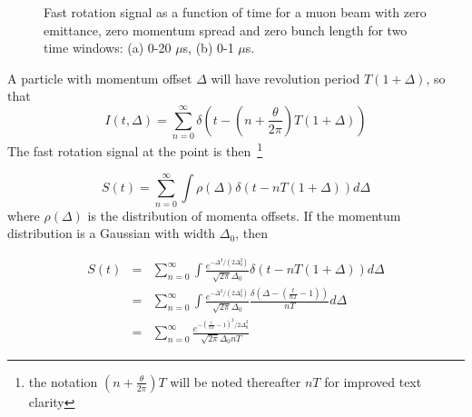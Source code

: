 \begin{figure}[bt]
\centering
{}
\caption{Fast rotation signal as a function of time for a muon beam with zero emittance, zero momentum spread and zero bunch length for two time windows: (a) 0-20 $\mu$s, (b) 0-1 $\mu$s.}
\label{fig:perfect_frs}
\end{figure}
 
A particle with momentum offset $\Delta$ will have revolution period $T(1+\Delta)$, so that 
\begin{equation}
I(t,\Delta)=\sum^{\infty}_{n=0}\delta\left(t-\left(n+\frac{\theta}{2\pi}\right)T\left(1+\Delta\right)\right) 
\end{equation}
The fast rotation signal at the point is then~\footnote{the notation $(n+\frac{\theta}{2\pi})T$ will be noted thereafter $nT$ for improved text clarity} 

\begin{equation}
S(t)=\sum^{\infty}_{n=0}\int\rho(\Delta)\delta\left(t-nT\left(1+\Delta\right)\right)d\Delta 
\end{equation}
where $\rho(\Delta)$ is the distribution of momenta offsets. If the momentum distribution is a Gaussian with width $\Delta_0$, then 

\begin{eqnarray}
S(t) &=& \sum^{\infty}_{n=0}\int\frac{e^{-\Delta^2/(2\Delta^2_0)}}{\sqrt{2\pi}\Delta_0}
\delta\left(t-nT\left(1+\Delta\right)\right)d\Delta\\
&=&\sum^{\infty}_{n=0}\int\frac{e^{-\Delta^2/(2\Delta^2_0)}}{\sqrt{2\pi}\Delta_0}\frac{\delta\left(\Delta-\left(\frac{t}{nT}-1\right)\right)}{nT}d\Delta\\
&=&\sum^{\infty}_{n=0}\frac{e^{-(\frac{t}{nT}-1)^2/2\Delta^2_0}}{\sqrt{2\pi}\Delta_0nT}\label{eq:Espread_frs}
\end{eqnarray}

